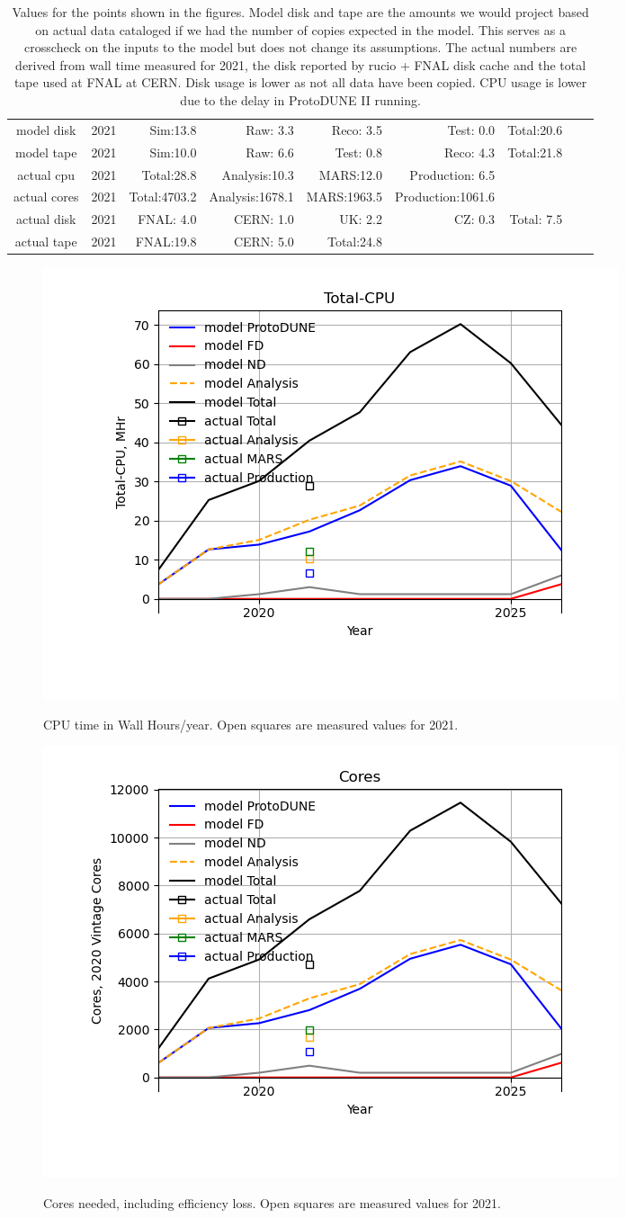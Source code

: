 \documentclass[12pt]{article}
\begin{document}
\begin{table}
\footnotesize
 \centering \begin{tabular}[h]{crrrrrrrr}
          model disk&2021&Sim:13.8&Raw: 3.3&Reco: 3.5&Test: 0.0&Total:20.6\\
          model tape&2021&Sim:10.0&Raw: 6.6&Test: 0.8&Reco: 4.3&Total:21.8\\
          actual cpu&2021&Total:28.8&Analysis:10.3&MARS:12.0&Production: 6.5\\
        actual cores&2021&Total:4703.2&Analysis:1678.1&MARS:1963.5&Production:1061.6\\
         actual disk&2021&FNAL: 4.0&CERN: 1.0&UK: 2.2&CZ: 0.3&Total: 7.5\\
         actual tape&2021&FNAL:19.8&CERN: 5.0&Total:24.8\\
\end{tabular}
\caption{Values for the points shown in the figures. Model disk and tape are the amounts we would project based on actual data cataloged if we had the number of copies expected in the model. This serves as a crosscheck on the inputs to the model but does not change its assumptions.  The actual numbers are derived from wall time measured for 2021, the disk reported by rucio + FNAL disk cache and the total tape used at FNAL at CERN. Disk usage is lower as not all data have been copied. CPU usage is lower due to the delay in ProtoDUNE II running.}\normalsize
 \end{table}
\pagebreak\begin{figure}
\centering\includegraphics[height=0.4\textwidth]{Total-CPU.png}\label{TotalCPU}
\caption{CPU time in Wall Hours/year. Open squares are measured values for 2021.}
\end{figure}
\begin{figure}
\centering\includegraphics[height=0.4\textwidth]{Cores.png}\label{Cores}
\caption{Cores needed, including efficiency loss. Open squares are measured values for 2021.}
\end{figure}
\end{document}
